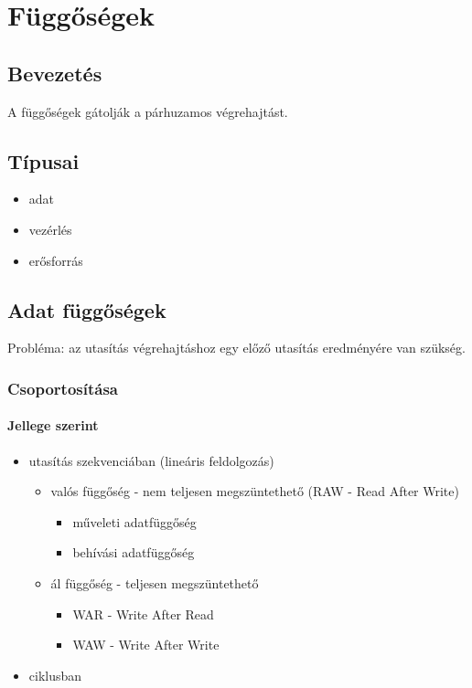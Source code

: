 
\chapter{Függőségek} \label{fuggosegek}

\section{Bevezetés}
A függőségek gátolják a párhuzamos végrehajtást.

\section{Típusai}
\begin{itemize}
    \item adat
    \item vezérlés
    \item erősforrás
\end{itemize}

\section{Adat függőségek}
Probléma: az utasítás végrehajtáshoz egy előző utasítás eredményére van szükség.

\subsection{Csoportosítása}
\subsubsection{Jellege szerint}
\begin{itemize}
    \item utasítás szekvenciában (lineáris feldolgozás)
          \begin{itemize}
              \item valós függőség - nem teljesen megszüntethető (RAW - Read After Write)
                    \begin{itemize}
                        \item műveleti adatfüggőség
                        \item behívási adatfüggőség
                    \end{itemize}
              \item ál függőség - teljesen megszüntethető
                    \begin{itemize}
                        \item WAR - Write After Read
                        \item WAW - Write After Write
                    \end{itemize}
          \end{itemize}
    \item ciklusban
\end{itemize}
